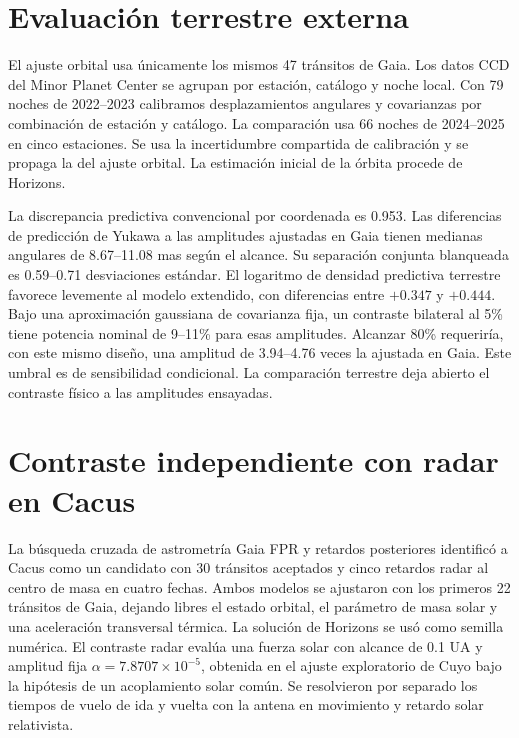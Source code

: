 \documentclass[11pt,a4paper]{article}
\begin{document}
\section{Evaluación terrestre externa}
El ajuste orbital usa únicamente los mismos 47 tránsitos de Gaia. Los datos CCD del Minor Planet Center se agrupan por estación, catálogo y noche local. Con 79 noches de 2022--2023 calibramos desplazamientos angulares y covarianzas por combinación de estación y catálogo. La comparación usa 66 noches de 2024--2025 en cinco estaciones. Se usa la incertidumbre compartida de calibración y se propaga la del ajuste orbital. La estimación inicial de la órbita procede de Horizons.

La discrepancia predictiva convencional por coordenada es 0.953. Las diferencias de predicción de Yukawa a las amplitudes ajustadas en Gaia tienen medianas angulares de 8.67--11.08 mas según el alcance. Su separación conjunta blanqueada es 0.59--0.71 desviaciones estándar. El logaritmo de densidad predictiva terrestre favorece levemente al modelo extendido, con diferencias entre $+0.347$ y $+0.444$. Bajo una aproximación gaussiana de covarianza fija, un contraste bilateral al 5\% tiene potencia nominal de 9--11\% para esas amplitudes. Alcanzar 80\% requeriría, con este mismo diseño, una amplitud de 3.94--4.76 veces la ajustada en Gaia. Este umbral es de sensibilidad condicional. La comparación terrestre deja abierto el contraste físico a las amplitudes ensayadas.

\section{Contraste independiente con radar en Cacus}
La búsqueda cruzada de astrometría Gaia FPR y retardos posteriores identificó a Cacus como un candidato con 30 tránsitos aceptados y cinco retardos radar al centro de masa en cuatro fechas. Ambos modelos se ajustaron con los primeros 22 tránsitos de Gaia, dejando libres el estado orbital, el parámetro de masa solar y una aceleración transversal térmica. La solución de Horizons se usó como semilla numérica. El contraste radar evalúa una fuerza solar con alcance de 0.1 UA y amplitud fija $\alpha=7.8707\times10^{-5}$, obtenida en el ajuste exploratorio de Cuyo bajo la hipótesis de un acoplamiento solar común. Se resolvieron por separado los tiempos de vuelo de ida y vuelta con la antena en movimiento y retardo solar relativista.
\end{document}
